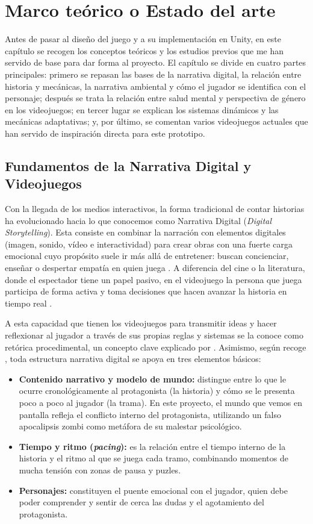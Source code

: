 \chapter{Marco teórico o Estado del arte}
\label{cap:estado}

Antes de pasar al diseño del juego y a su implementación en Unity, en este capítulo se recogen los conceptos teóricos y los estudios previos que me han servido de base para dar forma al proyecto. El capítulo se divide en cuatro partes principales: primero se repasan las bases de la narrativa digital, la relación entre historia y mecánicas, la narrativa ambiental y cómo el jugador se identifica con el personaje; después se trata la relación entre salud mental y perspectiva de género en los videojuegos; en tercer lugar se explican los sistemas dinámicos y las mecánicas adaptativas; y, por último, se comentan varios videojuegos actuales que han servido de inspiración directa para este prototipo.

\section{Fundamentos de la Narrativa Digital y Videojuegos}
Con la llegada de los medios interactivos, la forma tradicional de contar historias ha evolucionado hacia lo que conocemos como Narrativa Digital (\textit{Digital Storytelling}). Esta consiste en combinar la narración con elementos digitales (imagen, sonido, vídeo e interactividad) para crear obras con una fuerte carga emocional cuyo propósito suele ir más allá de entretener: buscan concienciar, enseñar o despertar empatía en quien juega \parencite{navarro2023}. A diferencia del cine o la literatura, donde el espectador tiene un papel pasivo, en el videojuego la persona que juega participa de forma activa y toma decisiones que hacen avanzar la historia en tiempo real \parencite{gomez2026, hernandez2024}.

A esta capacidad que tienen los videojuegos para transmitir ideas y hacer reflexionar al jugador a través de sus propias reglas y sistemas se la conoce como retórica procedimental, un concepto clave explicado por \textcite{bogost2011}. Asimismo, según recoge \textcite{navarro2023}, toda estructura narrativa digital se apoya en tres elementos básicos:

\begin{itemize}
  \item \textbf{Contenido narrativo y modelo de mundo:} distingue entre lo que le ocurre cronológicamente al protagonista (la historia) y cómo se le presenta poco a poco al jugador (la trama). En este proyecto, el mundo que vemos en pantalla refleja el conflicto interno del protagonista, utilizando un falso apocalipsis zombi como metáfora de su malestar psicológico.
  \item \textbf{Tiempo y ritmo (\textit{pacing}):} es la relación entre el tiempo interno de la historia y el ritmo al que se juega cada tramo, combinando momentos de mucha tensión con zonas de pausa y puzles.
  \item \textbf{Personajes:} constituyen el puente emocional con el jugador, quien debe poder comprender y sentir de cerca las dudas y el agotamiento del protagonista.
\end{itemize}

